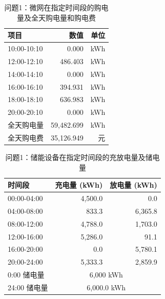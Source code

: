 \begin{table}[H]\centering\small
\caption{问题1：微网在指定时间段的购电量及全天购电量和购电费}\label{tab:p1t1}
\begin{tabular}{lrr}
\toprule
项目 & 数值 & 单位\\
\midrule
10:00-10:10 & 0.000 & kWh\\
12:00-12:10 & 486.403 & kWh\\
14:00-14:10 & 0.000 & kWh\\
16:00-16:10 & 394.931 & kWh\\
18:00-18:10 & 636.983 & kWh\\
20:00-20:10 & 0.000 & kWh\\
\midrule
全天购电量 & 59,482.699 & kWh\\
全天购电费 & 35,126.949 & 元\\
\bottomrule\end{tabular}\end{table}
\begin{table}[H]\centering\small
\caption{问题1：储能设备在指定时间段的充放电量及储电量}\label{tab:p1t2}
\begin{tabular}{lrr}
\toprule
时间段 & 充电量 (kWh) & 放电量 (kWh)\\
\midrule
00:00-04:00 & 4,500.0 & 0.0\\
04:00-08:00 & 833.3 & 6,365.8\\
08:00-12:00 & 4,788.0 & 1,703.0\\
12:00-16:00 & 5,286.0 & 91.1\\
16:00-20:00 & 0.0 & 5,780.1\\
20:00-24:00 & 5,333.3 & 2,859.9\\
\midrule
0:00 储电量 & \multicolumn{2}{c}{6,000 kWh}\\
24:00 储电量 & \multicolumn{2}{c}{6,000.0 kWh}\\
\bottomrule\end{tabular}\end{table}